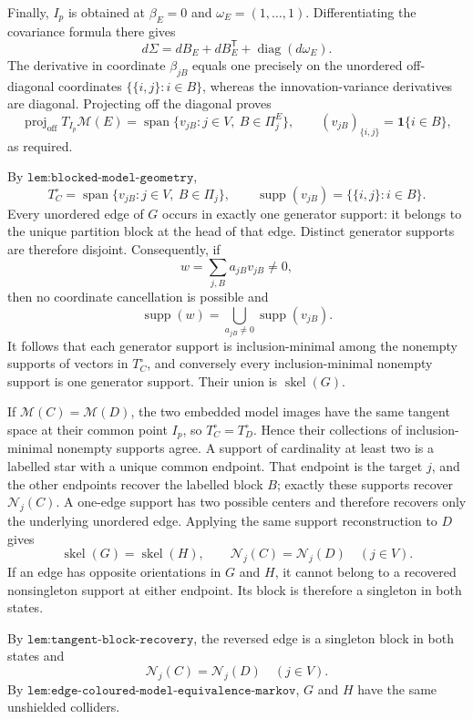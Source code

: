 Finally, \(I_p\) is obtained at \(\beta_E=0\) and \(\omega_E=(1,\ldots,1)\). Differentiating the covariance formula there gives
\[
 d\Sigma=dB_E+dB_E^{\mathsf T}+\operatorname{diag}(d\omega_E).
\]
The derivative in coordinate \(\beta_{jB}\) equals one precisely on the unordered off-diagonal coordinates \(\{\{i,j\}:i\in B\}\), whereas the innovation-variance derivatives are diagonal. Projecting off the diagonal proves
\[
 \operatorname{proj}_{\mathrm{off}}T_{I_p}\mathcal M(E)
 =\operatorname{span}\{v_{jB}:j\in V,\ B\in\Pi^E_j\},
 \qquad (v_{jB})_{\{i,j\}}=\mathbf 1\{i\in B\},
\]
as required.

By \(\texttt{lem:blocked-model-geometry}\),
\[
 T_C^{\circ}=\operatorname{span}\{v_{jB}:j\in V,\ B\in\Pi_j\},
 \qquad
 \operatorname{supp}(v_{jB})=\{\{i,j\}:i\in B\}.
\]
Every unordered edge of \(G\) occurs in exactly one generator support: it belongs to the unique partition block at the head of that edge. Distinct generator supports are therefore disjoint. Consequently, if
\[
 w=\sum_{j,B}a_{jB}v_{jB}\neq0,
\]
then no coordinate cancellation is possible and
\[
 \operatorname{supp}(w)=
 \bigcup_{a_{jB}\neq0}\operatorname{supp}(v_{jB}).
\]
It follows that each generator support is inclusion-minimal among the nonempty supports of vectors in \(T_C^{\circ}\), and conversely every inclusion-minimal nonempty support is one generator support. Their union is \(\operatorname{skel}(G)\).

If \(\mathcal M(C)=\mathcal M(D)\), the two embedded model images have the same tangent space at their common point \(I_p\), so \(T_C^{\circ}=T_D^{\circ}\). Hence their collections of inclusion-minimal nonempty supports agree. A support of cardinality at least two is a labelled star with a unique common endpoint. That endpoint is the target \(j\), and the other endpoints recover the labelled block \(B\); exactly these supports recover \(\mathcal N_j(C)\). A one-edge support has two possible centers and therefore recovers only the underlying unordered edge. Applying the same support reconstruction to \(D\) gives
\[
 \operatorname{skel}(G)=\operatorname{skel}(H),
 \qquad
 \mathcal N_j(C)=\mathcal N_j(D)\quad(j\in V).
\]
If an edge has opposite orientations in \(G\) and \(H\), it cannot belong to a recovered nonsingleton support at either endpoint. Its block is therefore a singleton in both states.

By \(\texttt{lem:tangent-block-recovery}\), the reversed edge is a singleton block in both states and
\[
 \mathcal N_j(C)=\mathcal N_j(D)\quad(j\in V).
\]
By \(\texttt{lem:edge-coloured-model-equivalence-markov}\), \(G\) and \(H\) have the same unshielded colliders.

